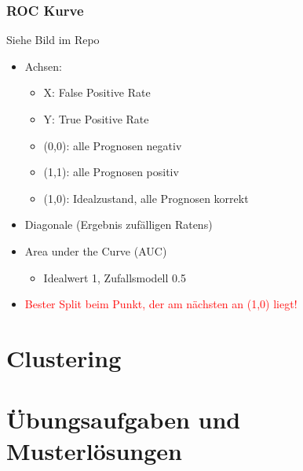\documentclass[a4paper]{article}
\begin{document}
\begin{landscape}
\begin{multicols}{3}
        \subsubsection{ROC Kurve}
        Siehe Bild im Repo
        \begin{itemize}[noitemsep,nolistsep]
            \item Achsen:
                \begin{itemize}[noitemsep,nolistsep]
                    \item X: False Positive Rate
                    \item Y: True Positive Rate
                    \item (0,0): alle Prognosen negativ
                    \item (1,1): alle Prognosen positiv 
                    \item (1,0): Idealzustand, alle Prognosen korrekt
                \end{itemize}
            \item Diagonale (Ergebnis zufälligen Ratens)
            \item Area under the Curve (AUC)
            \begin{itemize}[noitemsep,nolistsep]
                \item Idealwert 1, Zufallsmodell 0.5
            \end{itemize}
            \item \textcolor{red}{Bester Split beim Punkt, der am nächsten an (1,0) liegt!}
        \end{itemize}

    \section{Clustering}
    
    
    \end{multicols}


    \newpage


    \section{Übungsaufgaben und Musterlösungen}
\end{landscape}
\end{document}
